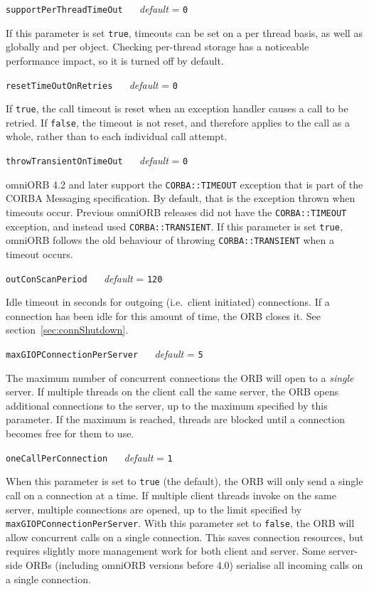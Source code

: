 \documentclass[11pt,oneside,a4paper]{book}
\makeatletter
\newcommand{\code}[1]{\texttt{#1}}
\newcommand{\confopt}[2]
  {\vspace{\baselineskip}\par\noindent\code{#1} ~~ \textit{default} =
   \code{#2}}
\renewcommand{\confopt}[2]
  {\vspace{\baselineskip}\par\noindent\code{#1} ~~ \textit{default} =
   \code{#2}\\[-1ex]\@afterheading}
\newcommand{\dsc}{\discretionary{}{}{}}
\makeatother
\begin{document}
\confopt{supportPerThreadTimeOut}{0}

If this parameter is set \code{true}, timeouts can be set on a per
thread basis, as well as globally and per object. Checking per-thread
storage has a noticeable performance impact, so it is turned off by
default.


\confopt{resetTimeOutOnRetries}{0}

If \code{true}, the call timeout is reset when an exception handler
causes a call to be retried. If \code{false}, the timeout is not
reset, and therefore applies to the call as a whole, rather than to
each individual call attempt.

\confopt{throwTransientOnTimeOut}{0}

omniORB 4.2 and later support the \code{CORBA::TIMEOUT} exception that
is part of the CORBA Messaging specification. By default, that is the
exception thrown when timeouts occur. Previous omniORB releases did
not have the \code{CORBA::TIMEOUT} exception, and instead used
\code{CORBA::TRANSIENT}. If this parameter is set \code{true}, omniORB
follows the old behaviour of throwing \code{CORBA::TRANSIENT} when a
timeout occurs.


\confopt{outConScanPeriod}{120}

Idle timeout in seconds for outgoing (i.e.\ client initiated)
connections. If a connection has been idle for this amount of time,
the ORB closes it. See section~\ref{sec:connShutdown}.


\confopt{maxGIOPConnectionPerServer}{5}

The maximum number of concurrent connections the ORB will open to a
\emph{single} server. If multiple threads on the client call the same
server, the ORB opens additional connections to the server, up to the
maximum specified by this parameter. If the maximum is reached,
threads are blocked until a connection becomes free for them to use.


\confopt{oneCallPerConnection}{1}

When this parameter is set to \code{true} (the default), the ORB will
only send a single call on a connection at a time. If multiple client
threads invoke on the same server, multiple connections are opened, up
to the limit specified by
\code{maxGIOP\dsc{}ConnectionPerServer}. With this parameter set to
\code{false}, the ORB will allow concurrent calls on a single
connection. This saves connection resources, but requires slightly
more management work for both client and server. Some server-side ORBs
(including omniORB versions before 4.0) serialise all incoming calls
on a single connection.
\end{document}
